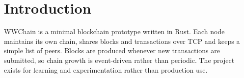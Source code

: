 \chapter{Introduction}
WWChain is a minimal blockchain prototype written in Rust. Each node maintains its own chain, shares blocks and transactions over TCP and keeps a simple list of peers. Blocks are produced whenever new transactions are submitted, so chain growth is event-driven rather than periodic. The project exists for learning and experimentation rather than production use.
